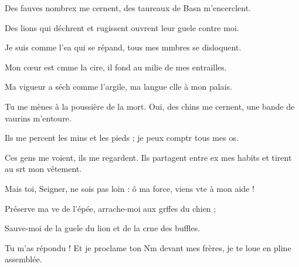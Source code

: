 \item Des fauves nombrex me cernent,\psstar{} des taureaux de Basn m’encerclent.
\item Des lions qui déchrent et rugissent\psstar{} ouvrent leur guele contre moi.
\item Je suis comme l’ea qui se répand,\psstar{} tous mes mmbres se disloquent.
\item Mon cœur est cmme la cire,\psstar{} il fond au milie de mes entrailles.
\item Ma vigueur a séch comme l’argile,\psstar{} ma langue clle à mon palais.
\item Tu me mènes à la poussière de la mort.\pscross{} Oui, des chins me cernent,\psstar{} une bande de vaurins m’entoure.
\item Ils me percent les mins et les pieds ;\psstar{} je peux comptr tous mes os.
\item Ces gens me voient, ils me regardent.\pscross{} Ils partagent entre ex mes habits\psstar{} et tirent au srt mon vêtement.
\item Mais toi, Seigner, ne sois pas loin :\psstar{} ô ma force, viens vte à mon aide !
\item Préserve ma ve de l’épée,\psstar{} arrache-moi aux grffes du chien ;
\item Sauve-moi de la guele du lion\psstar{} et de la crne des buffles.
\item Tu m’as répondu !\pscross{} Et je proclame ton Nm devant mes frères,\psstar{} je te loue en pline assemblée.